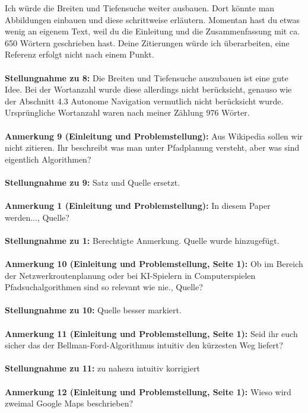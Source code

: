 \documentclass[a4paper,12pt]{book}
\begin{document}
Ich würde die Breiten und Tiefensuche weiter ausbauen. Dort könnte man Abbildungen einbauen und diese schrittweise erläutern. Momentan hast du etwas wenig an eigenem Text, weil du die Einleitung und die Zusammenfassung mit ca. 650 Wörtern geschrieben hast. Deine Zitierungen würde ich überarbeiten, eine Referenz erfolgt nicht nach einem Punkt. 
\\ \\
\textbf{Stellungnahme zu 8:}
Die Breiten und Tiefensuche auszubauen ist eine gute Idee. Bei der Wortanzahl wurde diese allerdings nicht berücksicht, genauso wie der Abschnitt 4.3 Autonome Navigation vermutlich nicht berücksicht wurde.
Ursprüngliche Wortanzahl waren nach meiner Zählung 976 Wörter.
\\ \\
\textbf{Anmerkung 9 (Einleitung und Problemstellung):}
Aus Wikipedia sollen wir nicht zitieren. Ihr beschreibt was man unter Pfadplanung versteht, aber was sind eigentlich Algorithmen?
\\ \\
\textbf{Stellungnahme zu 9:}
Satz und Quelle ersetzt.
\\ \\
\textbf{Anmerkung 1 (Einleitung und Problemstellung):}
\glqq In diesem Paper werden...\grqq, Quelle?
\\ \\
\textbf{Stellungnahme zu 1:}
Berechtigte Anmerkung. Quelle wurde hinzugefügt.
\\ \\
\textbf{Anmerkung 10 (Einleitung und Problemstellung, Seite 1):}
\glqq Ob im Bereich der Netzwerkroutenplanung oder bei KI-Spielern in Computerspielen Pfadsuchalgorithmen sind so relevant wie nie.\grqq, Quelle? 
\\ \\
\textbf{Stellungnahme zu 10:}
Quelle besser markiert.
\\ \\
\textbf{Anmerkung 11 (Einleitung und Problemstellung, Seite 1):}
Seid ihr euch sicher das der Bellman-Ford-Algorithmus \glqq intuitiv\grqq{} den kürzesten Weg liefert?
\\ \\
\textbf{Stellungnahme zu 11:}
zu \glqq nahezu intuitiv \grqq korrigiert
\\ \\
\textbf{Anmerkung 12 (Einleitung und Problemstellung, Seite 1):}
Wieso wird zweimal Google Maps beschrieben? 
\\ \\
\end{document}
